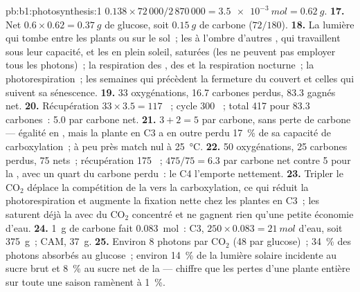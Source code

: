 \begin{solution}{pb:b1:photosynthesis:1}
$0.138\times 72\,000/2\,870\,000 = \qty{3.5e-3}{mol} = \qty{0.62}{g}$.
\textbf{17.} Net $0.6\times 0.62 = \qty{0.37}{g}$ de glucose, soit
$\qty{0.15}{g}$ de carbone ($72/180$).
\textbf{18.} La lumière qui tombe entre les plants ou sur le sol~; les
 à l'ombre d'autres , qui travaillent sous leur
capacité, et les  en plein soleil, saturées (les  ne
peuvent pas employer tous les photons)~; la respiration des , des
 et la respiration nocturne~; la photorespiration~; les semaines
qui précèdent la fermeture du couvert et celles qui suivent sa
sénescence.
\textbf{19.} 33 oxygénations, 16.7 carbones perdus, 83.3 gagnés net.
\textbf{20.} Récupération $33\times 3.5 = 117$ ~; cycle 300 ~;
total 417  pour 83.3 carbones~: 5.0  par carbone net.
\textbf{21.} $3 + 2 = 5$  par carbone, sans perte de carbone ---
égalité en , mais la plante en C3 a en outre perdu \qty{17}{\%} de sa
capacité de carboxylation~; à peu près match nul à \qty{25}{\celsius}.
\textbf{22.} 50 oxygénations, 25 carbones perdus, 75 nets~;
récupération 175 ~; $475/75 = 6.3$  par carbone net contre 5 pour
la , avec un quart du carbone perdu~: le C4 l'emporte
nettement.
\textbf{23.} Tripler le $\mathrm{CO_2}$ déplace la compétition de la
 vers la carboxylation, ce qui réduit la photorespiration et
augmente la fixation nette chez les plantes en C3~; les 
saturent déjà la  avec du $\mathrm{CO_2}$ concentré et ne gagnent
rien qu'une petite économie d'eau.
\textbf{24.} \qty{1}{g} de carbone fait \qty{0.083}{mol}~: C3, $250\times 0.083 = \qty{21}{mol}$ d'eau, soit \qty{375}{g}~; CAM, \qty{37}{g}.
\textbf{25.} Environ 8 photons par $\mathrm{CO_2}$ (48 par glucose)~;
\qty{34}{\%} des photons absorbés au glucose~; environ \qty{14}{\%} de
la lumière solaire incidente au sucre brut et \qty{8}{\%} au sucre net
de la  --- chiffre que les pertes d'une plante entière sur toute
une saison ramènent à \qty{1}{\%}.
\end{solution}
